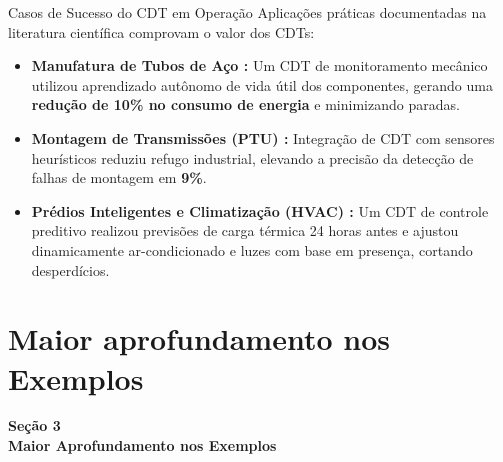 \documentclass[aspectratio=169,xcolor=dvipsnames]{beamer}
\begin{document}
\begin{frame}{Casos de Sucesso do CDT em Operação}
    Aplicações práticas documentadas na literatura científica comprovam o valor dos CDTs:
    \vspace{0.4em}
    \begin{itemize}\setlength\itemsep{4pt}
        \item \textbf{Manufatura de Tubos de Aço \cite{zheng2022emergence}:} Um CDT de monitoramento mecânico utilizou aprendizado autônomo de vida útil dos componentes, gerando uma \textbf{redução de 10\% no consumo de energia} e minimizando paradas.
        \item \textbf{Montagem de Transmissões (PTU) \cite{zheng2022emergence}:} Integração de CDT com sensores heurísticos reduziu refugo industrial, elevando a precisão da detecção de falhas de montagem em \textbf{9\%}.
        \item \textbf{Prédios Inteligentes e Climatização (HVAC) \cite{elmokhtari2022hvac}:} Um CDT de controle preditivo realizou previsões de carga térmica 24 horas antes e ajustou dinamicamente ar-condicionado e luzes com base em presença, cortando desperdícios.
    \end{itemize}
\end{frame}


\section{Maior aprofundamento nos Exemplos}

\begin{frame}[plain]
    \vfill
    \centering
    {\Large\textcolor{dexpiBlue}{\textbf{Seção 3}}}\\[0.8em]
    {\LARGE\textbf{Maior Aprofundamento nos Exemplos}}\\[0.6em]
    \vfill
\end{frame}
\end{document}
